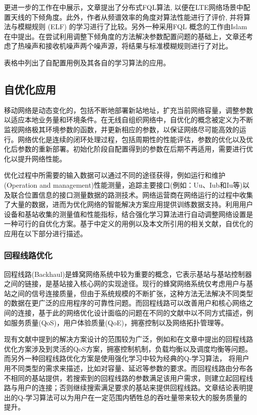 ﻿\documentclass[11pt,draftclsnofoot,onecolumn,journal,letterpaper]{IEEEtran}
\begin{document}
更进一步的工作在\cite{Razavi2010a}中展示，文章提出了分布式FQL算法, 以便在LTE网络场景中配置天线的下倾角度。此外，作者从频谱效率的角度对算法性能进行了评价, 并将算法与模糊规则 (ELF) 的学习进行了比较。另外一种采用FQL 概念的工作由Islam 在\cite{Islam2012}中提出。在尝试利用调整下倾角度的方法解决参数配置问题的基础上，文章还考虑了热噪声和接收机噪声两个噪声源，将结果与标准模糊规则进行了对比。

表格中列出了自配置用例及其各自的学习算法的应用。


\subsection{自优化应用}
\label{sec:self-optimization}
移动网络是动态变化的，包括不断地部署新站地址，扩充当前网络容量，调整参数以适应本地业务量和环境条件。在无线自组织网络中，自优化的概念被定义为不断监视网络极其环境参数的函数，并更新相应的参数，以保证网络尽可能高效的运行\cite{Aliu2013}。网络优化是连续的闭环处理过程，包括周期性的性能评估，参数的优化以及优化后参数的重新部署。初始化阶段自配置得到的参数在后期不再适用，需要进行优化以提升网络性能。%

优化过程中所需要的输入数据可以通过不同的途径获得，例如运行和维护(Operation and management)性能测量，追踪主要接口(例如：Uu、Iub和Iu等)以及联合位置信息的接口测量数据的路测技术。网络运营商在网络运行的过程中收集了大量的数据，进而为优化网络的智能解决方案应用提供训练数据支持。利用用户设备和基站收集的测量值和性能指标，结合强化学习算法进行自动调整网络设置是一种可行的自优化方案。基于\cite{3gpp.36.902}中定义的用例以及本文所引用的相关文献，自优化的应用在以下部分进行描述。

\subsubsection{回程线路优化}

回程线路(Backhaul)是蜂窝网络系统中较为重要的概念，它表示基站与基站控制器之间的链接，是基站接入核心网的实现途径。现行的蜂窝网络系统仅考虑用户与基站之间的信号连接质量，但由于系统规模的不断扩张，这种方法无法解决不同类型的数据在更广泛的应用程序的可靠性问题。而回程线路可以改善用户和核心网络之间的连接，基于此的网络优化设计面临的问题在不同的文献中以不同方式描述，例如服务质量(QoS)，用户体验质量(QoE)，拥塞控制以及网络拓扑管理等。

现有文献中提到的解决方案设计的范围较为广泛，例如\cite{Wainio2016}和\cite{Chen2015}在文章中提出的回程线路优化方案涉及到灵活的QoS方案，拥塞控制机制，负载均衡以及调度均衡等问题。而另外一种回程线路优化方案是使用强化学习中较为经典的Q-学习算法，\cite{Jaber2015}\cite{Jaber2016a}\cite{Jaber2016c} 将用户用不同类型的需求来描述，比如对容量、延迟等参数的要求。而回程线路由分布各不相同的基站提供，若搜索到的回程线路的参数满足该用户需求，则建立起回程线路与用户的连接；否则继续搜索满足要求的基站来提供回程线路。文章结论表明提出的Q-学习算法可以为用户在一定范围内牺牲总的吞吐量带来较大的服务质量的提升。
\end{document}
